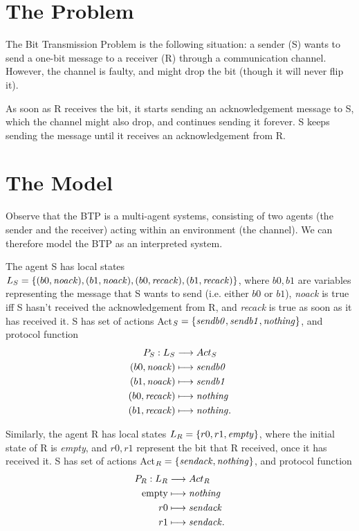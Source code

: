 \documentclass[11pt]{report}
\begin{document}
\section{The Problem}

The Bit Transmission Problem is the following situation: a sender (S) wants to send a one-bit message to a receiver (R) through a communication channel. However, the channel is faulty, and might drop the bit (though it will never flip it). 

As soon as R receives the bit, it starts sending an acknowledgement message to S, which the channel might also drop, and continues sending it forever. S keeps sending the message until it receives an acknowledgement from R.

\section{The Model}

Observe that the BTP is a multi-agent systems, consisting of two agents (the sender and the receiver) acting within an environment (the channel).
We can therefore model the BTP as an interpreted system. 


The agent S has local states $L_S = \{(b0, \mbox{\textit{noack}}), (b1, \mbox{\textit{noack}}), (b0, \mbox{\textit{recack}}), (b1, \mbox{\textit{recack}})\}$, where $b0, b1$ are variables representing the message that S wants to send (i.e. either $b0$ or $b1$), \textit{noack} is true iff S hasn't received the acknowledgement from R, and \textit{recack} is true as soon as it has received it. S has set of actions Act$_S = \{\mbox{\textit{sendb0}}, \mbox{\textit{sendb1}}, \mbox{\textit{nothing}}\}$, and protocol function 
\begin{align*}
P_S: L_S &\longrightarrow Act_S \\
	 (b0, \mbox{\textit{noack}}) &\longmapsto \mbox{\textit{sendb0}} \\
	 (b1, \mbox{\textit{noack}}) &\longmapsto \mbox{\textit{sendb1}} \\
	 (b0, \mbox{\textit{recack}}) &\longmapsto \mbox{\textit{nothing}} \\
	 (b1, \mbox{\textit{recack}}) &\longmapsto \mbox{\textit{nothing}}.
\end{align*}

Similarly, the agent R has local states $L_R = \{r0, r1, \mbox{\textit{empty}}\}$, where the initial state of R is \textit{empty}, and $r0, r1$ represent the bit that R received, once it has received it. S has set of actions Act$_R = \{\mbox{\textit{sendack}}, \mbox{\textit{nothing}}\}$, and protocol function 
\begin{align*}
P_R: L_R &\longrightarrow Act_R \\
     \mbox{empty} &\longmapsto \mbox{\textit{nothing}} \\
	 r0 &\longmapsto \mbox{\textit{sendack}} \\
	 r1 &\longmapsto \mbox{\textit{sendack}}.
\end{align*}
\end{document}
